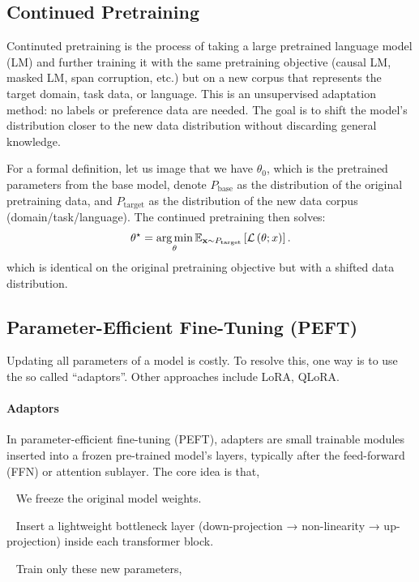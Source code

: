 \documentclass[11pt]{article}  %
\begin{document}
\subsection{Continued Pretraining}
Continuted pretraining is the process of taking a large pretrained language model (LM) and further training it with the same pretraining objective (causal LM, masked LM, span corruption, etc.) but on a new corpus that represents the target domain, task data, or language.
This is an unsupervised adaptation method: no labels or preference data are needed.
The goal is to shift the model's distribution closer to the new data distribution without discarding general knowledge.

For a formal definition, let us image that we have $\theta_0$, which is the pretrained parameters from the base model, denote $P_{\text{base}}$ as the distribution of the original pretraining data, and $P_{\text{target}}$ as the distribution of the new data corpus (domain/task/language).
The continued pretraining then solves:
\begin{align*}
  \theta^\star = \operatorname*{arg\,min}_{\theta} \mathbb{E}_{\mathbf{x} \sim P_{\text{target}}}\left[\mathcal{L}\left( \theta; x \right)\right].
\end{align*}
which is identical on the original pretraining objective but with a shifted data distribution.



\subsection{Parameter-Efficient Fine-Tuning (PEFT)}  Updating all parameters of a model is costly. 
To resolve this, one way is to use the so called ``adaptors''.
Other approaches include LoRA, QLoRA.

\paragraph{Adaptors} In parameter-efficient fine-tuning (PEFT), adapters are small trainable modules inserted into a frozen pre-trained model's layers, typically after the feed-forward (FFN) or attention sublayer.
The core idea is that, 

\textbullet~ We freeze the original model weights.

\textbullet~ Insert a lightweight bottleneck layer (down-projection → non-linearity → up-projection) inside each transformer block.

\textbullet~ Train only these new parameters,
\end{document}
